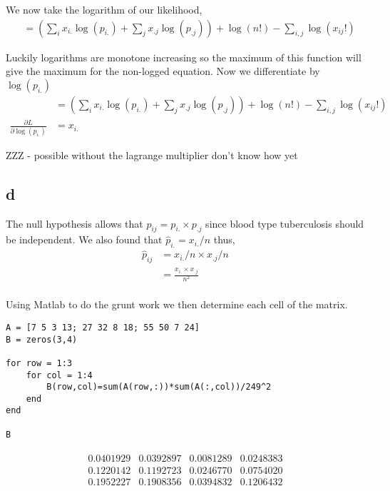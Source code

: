 \documentclass{article}
\begin{document}
We now take the logarithm of our likelihood,
\begin{align*}
    &= \left(\sum_i x_{i.} \log (p_{i.}) + \sum_j x_{.j} \log (p_{.j})\right)
    + \log (n!) - \sum_{i,j} \log (x_{ij}!)
\end{align*}

Luckily logarithms are monotone increasing so the maximum of this function will
give the maximum for the non-logged equation. Now we differentiate by $\log(p_{i.})$
\begin{align*}
    &= \left(\sum_i x_{i.} \log (p_{i.}) + \sum_j x_{.j} \log (p_{.j})\right)
    + \log (n!) - \sum_{i,j} \log (x_{ij}!) \\
    \frac{\partial L}{\partial\log(p_{i.})} &= x_{i.}
\end{align*}

ZZZ - possible without the lagrange multiplier don't know how yet

\subsection{d}
The null hypothesis allows that $p_{ij} = p_{i.} \times p_{.j}$ since blood type
tuberculosis should be independent.
We also found that $\hat{p}_{i.} = x_{i.}/n$ thus,
\begin{align*}
    \hat{p}_{ij} &= x_{i.}/n \times x_{.j}/n \\
    &= \frac{x_{i.}\times x_{.j}}{n^2} \\
\end{align*}

Using Matlab to do the grunt work we then determine each cell of the matrix.
\begin{verbatim}
A = [7 5 3 13; 27 32 8 18; 55 50 7 24]
B = zeros(3,4)

for row = 1:3
    for col = 1:4
        B(row,col)=sum(A(row,:))*sum(A(:,col))/249^2
    end
end

B
\end{verbatim}

\begin{align*}
    \begin{matrix}
        0.0401929 & 0.0392897 & 0.0081289 & 0.0248383 \\
        0.1220142 & 0.1192723 & 0.0246770 & 0.0754020 \\
        0.1952227 & 0.1908356 & 0.0394832 & 0.1206432 \\
    \end{matrix}
\end{align*}
\end{document}
